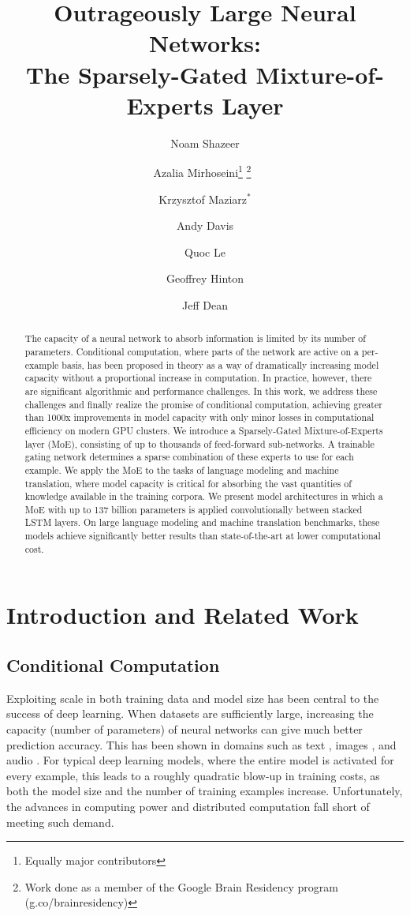 \documentclass{article}
\title{\Large Outrageously Large Neural Networks: \\
The Sparsely-Gated Mixture-of-Experts Layer}
\author[1]{Noam Shazeer}
\author[1]{Azalia Mirhoseini\thanks{Equally major contributors} \thanks{Work done as a member of the Google Brain Residency program (g.co/brainresidency)}~}
\author[2]{Krzysztof Maziarz$^*$}
\author[1]{Andy Davis}
\author[1]{Quoc Le}
\author[1]{Geoffrey Hinton}
\author[1]{Jeff Dean}
\affil[1]{Google Brain, \{noam,azalia,andydavis,qvl,geoffhinton,jeff\}@google.com}
\affil[2]{Jagiellonian University, Cracow, krzysztof.maziarz@student.uj.edu.pl}
\begin{document}
\maketitle

\begin{abstract}

The capacity of a neural network to absorb information is limited by its number of parameters.  Conditional computation, where parts of the network are active on a per-example basis, has been proposed in theory as a way of dramatically increasing model capacity without a proportional increase in computation.  In practice, however, there are significant algorithmic and performance challenges.  In this work, we address these challenges and finally realize the promise of conditional computation, achieving greater than 1000x improvements in model capacity with only minor losses in computational efficiency on modern GPU clusters.  We introduce a Sparsely-Gated Mixture-of-Experts layer (MoE), consisting of up to thousands of feed-forward sub-networks.  A trainable gating network determines a sparse combination of these experts to use for each example.  We apply the MoE to the tasks of language modeling and machine translation, where model capacity is critical for absorbing the vast quantities of knowledge available in the training corpora.  We present model architectures in which a MoE with up to 137 billion parameters is applied convolutionally between stacked LSTM layers.  On large language modeling and machine translation benchmarks, these models achieve significantly better results than state-of-the-art at lower computational cost.

\end{abstract}

\section{Introduction and Related Work}
\subsection{Conditional Computation}

Exploiting scale in both training data and model size has been central to the success of deep learning. When datasets are sufficiently large, increasing the capacity (number of parameters) of neural networks can give much better prediction accuracy.  This has been shown in domains such as text \citep{sutskever2014sequence,bahdanau2014neural,RafalNoam16,GNMT}, images \citep{Imagenet,qvl2012building}, and audio \citep{hinton2012deep,DeepSpeech2}.   For typical deep learning models, where the entire model is activated for every example, this leads to a roughly quadratic blow-up in training costs, as both the model size and the number of training examples increase.  Unfortunately, the advances in computing power and distributed computation fall short of meeting such demand. 
\end{document}
